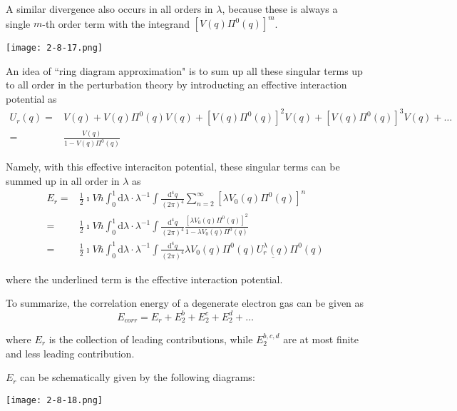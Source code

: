 A similar divergence also occurs in all orders in $\lambda$, because these is always a single $m$-th order term with the integrand $\left[ V(q) \Pi^0(q) \right]^m$.

\begin{center} \label{Fig2.8.17}
\texttt{[image: 2-8-17.png]}
\end{center}

An idea of ``ring diagram approximation" is to sum up all these singular terms up to all order in the perturbation theory by introducting an effective interaction potential as
\[\begin{split} U_r(q) =& V(q) + V(q)\Pi^0(q) V(q) + [V(q)\Pi^0(q)]^2 V(q) + [V(q)\Pi^0(q)]^3 V(q) + \ldots \\ 
=& \frac{V(q)}{1-V(q)\Pi^0(q)}
\end{split}\]

Namely, with this effective interaciton potential, these singular terms can be summed up in all order in $\lambda$ as
\begin{equation} \label{Eqs2.8.9} \begin{split}
E_r =& \frac{1}{2}\imath V\hbar \int_0^1 \mathrm{d} \lambda \cdot \lambda^{-1} \int \frac{\mathrm{d}^4 q}{(2\pi)^4} \sum_{n=2}^\infty [ \lambda V_0(q) \Pi^0(q) ]^n\\
=& \frac{1}{2}\imath V\hbar \int_0^1 \mathrm{d} \lambda \cdot \lambda^{-1} \int \frac{\mathrm{d}^4 q}{(2\pi)^4} \frac{[\lambda V_0(q) \Pi^0(q)]^2}{1-\lambda V_0(q) \Pi^0(q)}\\
=& \frac{1}{2}\imath V\hbar \int_0^1 \mathrm{d} \lambda \cdot \lambda^{-1} \int \frac{\mathrm{d}^4 q}{(2\pi)^4} \lambda V_0(q) \Pi^0(q) \underline{U_r^\lambda(q)} \Pi^0(q)
\end{split}\end{equation}

where the underlined term is the effective interaction potential.

To summarize, the correlation energy of a degenerate electron gas can be given as
\[E_{corr} = E_r + E_2^b + E_2^c + E_2^d+\ldots\]

where $E_r$ is the collection of leading contributions, while $E_2^{b,c,d}$ are at most finite and less leading contribution.

$E_r$ can be schematically given by the following diagrams:
\begin{center} \label{Fig2.8.18}
\texttt{[image: 2-8-18.png]}
\end{center}

